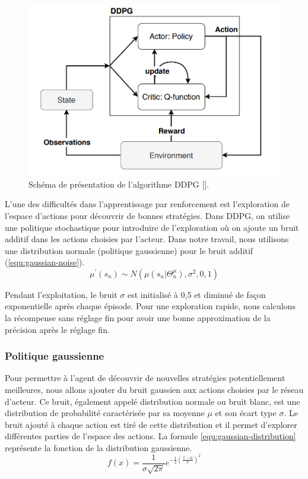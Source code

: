 \begin{figure}[hbt!]
  \centering
  \includegraphics[width=15cm]{images_pfe/ddpg-overview.png}
  \caption{Schéma de présentation de l'algorithme DDPG [\cite{handaoui2020releaser}].}
  \label{fig:ddpg-overview}
\end{figure}
\FloatBarrier
\medskip

L'une des difficultés dans l'apprentissage par renforcement est l'exploration de l'espace d'actions pour découvrir de bonnes stratégies. Dans DDPG, on utilise une politique stochastique pour introduire de l'exploration où on ajoute un bruit additif dans les actions choisies par l'acteur. Dans notre travail, nous utilisons une distribution normale (politique gaussienne) pour le bruit additif (\ref{equ:gaussian-noise}).
\begin{equation}
    \mu^{'} (s_n) \sim N(\mu (s_n | \Theta_{n}^{\mu}), \sigma^2, 0, 1)
    \label{equ:gaussian-noise}
\end{equation}

Pendant l'exploitation, le bruit $\sigma$ est initialisé à 0,5 et diminué de façon exponentielle après chaque épisode. Pour une exploration rapide, nous calculons la récompense sans réglage fin pour avoir une bonne approximation de la précision après le réglage fin.

\subsubsection{Politique gaussienne}
Pour permettre à l'agent de découvrir de nouvelles stratégies potentiellement meilleures, nous allons ajouter du bruit gaussien aux actions choisies par le réseau d'acteur. Ce bruit, également appelé distribution normale ou bruit blanc, est une distribution de probabilité caractérisée par sa moyenne $\mu$ et son écart type $\sigma$. Le bruit ajouté à chaque action est tiré de cette distribution et il permet d'explorer différentes parties de l'espace des actions. La formule \ref{equ:gaussian-distribution} représente la fonction de la distribution gaussienne.
\begin{equation}
    f(x) = \frac{1}{\sigma \sqrt{2\pi}}e^{-\frac{1}{2}(\frac{x-\mu}{\sigma})^2}
    \label{equ:gaussian-distribution}
\end{equation}


